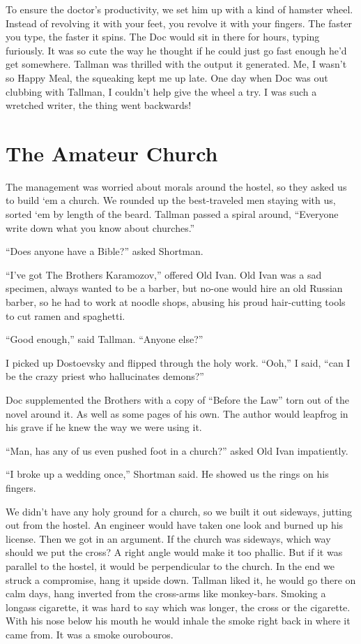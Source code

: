 \documentclass[oneside]{book}
\begin{document}
To ensure the doctor's productivity, we set him up with a kind of hamster
wheel.  Instead of revolving it with your feet, you revolve it with your fingers.
The faster you type, the faster it spins.  The Doc would sit in there for hours,
typing furiously.  It was so cute the way he thought if he could just go
fast enough he'd get somewhere.  Tallman was thrilled with the output it
generated.  Me, I wasn't so Happy Meal, the squeaking kept me up late.
One day when Doc was out clubbing with Tallman, I couldn't help give the wheel
a try.  I was such a wretched writer, the thing went backwards!


\chapter{The Amateur Church}

The management was worried about morals around the hostel, so they asked us to build `em a church.
We rounded up the best-traveled men staying with us, sorted `em by length of the beard.
Tallman passed a spiral around,
``Everyone write down what you know about churches.''

``Does anyone have a Bible?'' asked Shortman.

``I've got The Brothers Karamozov,'' offered Old Ivan.  Old Ivan was a sad specimen,
always wanted to be a barber, but no-one would hire an old Russian barber, so he had to work at noodle shops, abusing his
proud hair-cutting tools to cut ramen and spaghetti.

``Good enough,'' said Tallman.  ``Anyone else?''

I picked up Dostoevsky and flipped through the holy work.  ``Ooh,'' I said, ``can I be the crazy priest
who hallucinates demons?''

Doc supplemented the Brothers with a copy of ``Before the Law'' torn out of the novel around it.  As well as some
pages of his own.  The author would leapfrog in his grave if he knew the way we were using it.

``Man, has any of us even pushed foot in a church?'' asked Old Ivan impatiently.

``I broke up a wedding once,'' Shortman said.  He showed us the rings on his fingers.

We didn't have any holy ground for a church, so we built it out sideways, jutting out from the hostel.
An engineer would have taken one look and burned up his license.
Then we got in an argument.  If the church was sideways, which way should we put the cross?
A right angle would make it too phallic.  But if it was parallel to the hostel, it would be perpendicular
to the church.  In the end we struck a compromise, hang it upside down.
Tallman liked it, he would go there on calm days, hang inverted from the cross-arms like monkey-bars.
Smoking a longass cigarette, it was hard to say which was longer, the cross or the cigarette.
With his nose below his mouth he would inhale the smoke right back in where it came from.
It was a smoke ourobouros.
\end{document}
